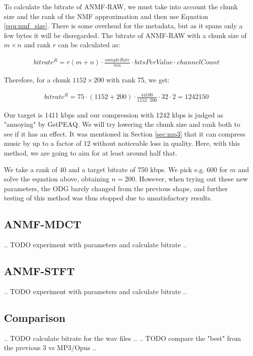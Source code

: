 To calculate the bitrate of ANMF-RAW, we must take into account the chunk size and the rank of the NMF approximation and then use Equation \ref{equ:nmf_size}. There is some overhead for the metadata, but as it spans only a few bytes it will be disregarded. The bitrate of ANMF-RAW with a chunk size of $m \times n$ and rank $r$ can be calculated as:

\begin{align}
bitrate^R = r(m+n) \cdot \frac{sampleRate}{mn} \cdot bitsPerValue \cdot channelCount
\end{align}

Therefore, for a chunk $1152 \times 200$ with rank 75, we get:

\begin{align}
bitrate^R = 75 \cdot (1152 + 200) \cdot \frac{44100}{1152 \cdot 200} \cdot 32 \cdot 2 = 1242150
\end{align}

Our target is 1411 kbps and our compression with 1242 kbps is judged as "annoying" by GstPEAQ. We will try lowering the chunk size and rank both to see if it has an effect. It was mentioned in Section \ref{sec:mp3} that it can compress music by up to a factor of 12 without noticeable loss in quality. Here, with this method, we are going to aim for at least around half that.

We take a rank of 40 and a target bitrate of 750 kbps. We pick e.g. $600$ for $m$ and solve the equation above, obtaining $n = 200$. However, when trying out these new parameters, the ODG barely changed from the previous shape, and further testing of this method was thus stopped due to unsatisfactory results.

\subsection{ANMF-MDCT}
.. TODO experiment with parameters and calculate bitrate ..

\subsection{ANMF-STFT}
.. TODO experiment with parameters and calculate bitrate ..

\subsection{Comparison}
.. TODO calculate bitrate for the wav files ..
.. TODO compare the "best" from the previous 3 vs MP3/Opus ..
